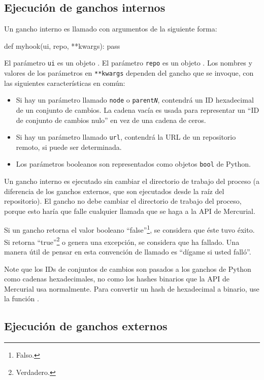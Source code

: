 \subsection{Ejecución de ganchos internos}

Un gancho interno es llamado con argumentos de la siguiente forma:
\begin{codesample2}
  def myhook(ui, repo, **kwargs):
      pass
\end{codesample2}
El parámetro \texttt{ui} es un objeto .
El parámetro \texttt{repo} es un objeto
. Los nombres y
valores de los parámetros en \texttt{**kwargs} dependen del gancho que
se invoque, con las siguientes características en común:
\begin{itemize}
\item Si hay un parámetro llamado \texttt{node} o
  \texttt{parent\emph{N}}, contendrá un ID hexadecimal de un conjunto
  de cambios. La cadena vacía es usada para representar un
  ``ID de conjunto de cambios nulo'' en vez de una cadena de ceros.
\item Si hay un parámetro llamado \texttt{url}, contendrá la URL de un
  repositorio remoto, si puede ser determinada.
\item Los parámetros booleanos son representados como objetos
    \texttt{bool} de Python.
\end{itemize}

Un gancho interno es ejecutado sin cambiar el directorio de trabajo
del proceso (a diferencia de los ganchos externos, que son ejecutados
desde la raíz del repositorio). El gancho no debe cambiar el
directorio de trabajo del proceso, porque esto haría que falle
cualquier llamada que se haga a la API de Mercurial.

Si un gancho retorna el valor booleano ``false''\footnote{Falso.}, se
considera que éste tuvo éxito. Si retorna
``true''\footnote{Verdadero.} o genera una excepción, se considera que
ha fallado. Una manera útil de pensar en esta convención de llamado es
``dígame si usted falló''.

Note que los IDs de conjuntos de cambios son pasados a los ganchos de
Python como cadenas hexadecimales, no como los hashes binarios que la
API de Mercurial usa normalmente. Para convertir un hash de
hexadecimal a binario, use la función .

\subsection{Ejecución de ganchos externos}

